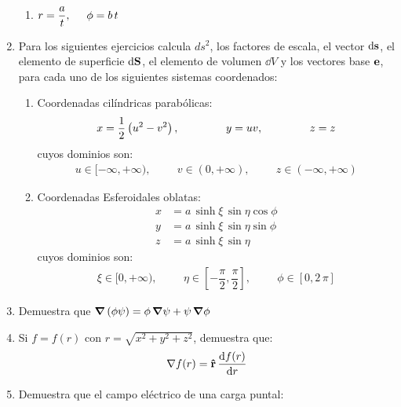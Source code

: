 \documentclass[12pt]{article}
\begin{document}
\begin{enumerate}
\begin{enumerate}[label=\arabic{enumi}.\arabic*)]
\item $r = \dfrac{a}{t}, \hspace{0.5cm} \phi = b \, t$
\end{enumerate}
\item Para los siguientes ejercicios calcula $ds^{2}$, los factores de escala, el vector $\dd{\vb{s}}$, el elemento de superficie $\dd{\vb{S}}$, el elemento de volumen $\dd{V}$ y los vectores base $\vb{e}$, para cada uno de los siguientes sistemas coordenados:
\begin{enumerate}[label=\arabic{enumi}.\arabic*)]
\item  Coordenadas cilíndricas parabólicas:
\begin{align*}
x = \dfrac{1}{2} \left( u^{2} - v^{2} \right), \hspace{1.5cm} y = uv, \hspace{1.5cm} z = z
\end{align*}
cuyos dominios son:
\begin{align*}
u \in [-\infty, +\infty), \hspace{1cm} v \in (0, +\infty), \hspace{1cm} z \in (-\infty, +\infty)
\end{align*}
\item Coordenadas Esferoidales oblatas:
\begin{align*}
x &= a \, \sinh \xi \, \sin \eta \cos \phi \\[0.5em]
y &= a \, \sinh \xi \, \sin \eta \sin \phi \\[0.5em]
z &= a \, \sinh \xi \, \sin \eta
\end{align*}
cuyos dominios son:
\begin{align*}
\xi \in [0, +\infty), \hspace{1cm} \eta \in \left[ - \dfrac{\pi}{2}, \dfrac{\pi}{2} \right], \hspace{1cm} \phi \in [0, 2 \, \pi]
\end{align*}
\end{enumerate}
\item Demuestra que $\grad{\left( \phi \psi \right)} = \phi \, \grad{\psi} + \psi \, \grad{\phi}$
\item Si $f = f(r)$ con $r = \sqrt{x^{2} + y^{2}+ z^{2}}$, demuestra que:
\begin{align*}
\nabla{f(r)} = \vu{r} \, \dv{f(r)}{r}
\end{align*}
\item Demuestra que el campo eléctrico de una carga puntal:
\begin{align*}

\end{align*}
\end{enumerate}
\end{document}
